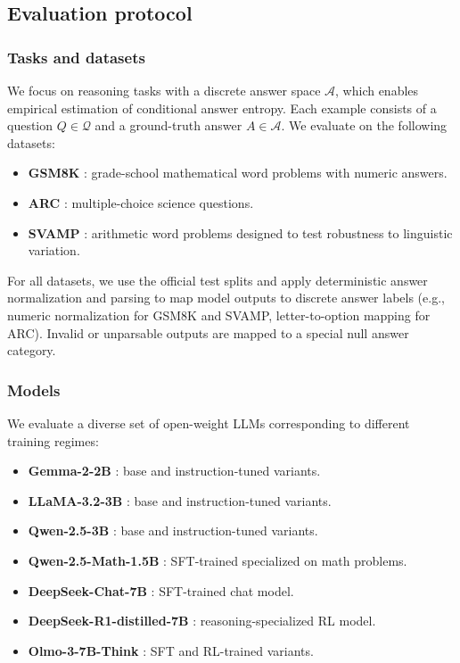 \documentclass{article}
\begin{document}
\subsection{Evaluation protocol}
\label{subsec:eval_protocol}

\subsubsection{Tasks and datasets}
\label{subsec:tasks_datasets}

We focus on reasoning tasks with a discrete answer space \(\mathcal{A}\), which enables empirical estimation of conditional answer entropy. Each example consists of a question \(Q \in \mathcal{Q}\) and a ground-truth answer \(A \in \mathcal{A}\). We evaluate on the following datasets:

\begin{itemize}
\item \textbf{GSM8K} \cite{cobbe2021trainingverifierssolvemath}: grade-school mathematical word problems with numeric answers.
\item \textbf{ARC} \cite{clark2018thinksolvedquestionanswering}: multiple-choice science questions.
\item \textbf{SVAMP} \cite{patel2021nlpmodelsreallyable}: arithmetic word problems designed to test robustness to linguistic variation.
\end{itemize}

For all datasets, we use the official test splits and apply deterministic answer normalization and parsing to map model outputs to discrete answer labels (e.g., numeric normalization for GSM8K and SVAMP, letter-to-option mapping for ARC). Invalid or unparsable outputs are mapped to a special null answer category.

\subsubsection{Models}
\label{subsec:models}

We evaluate a diverse set of open-weight LLMs corresponding to different training regimes:

\begin{itemize}
\item \textbf{Gemma-2-2B} \cite{gemmateam2024gemma2improvingopen}: base and instruction-tuned variants.
\item \textbf{LLaMA-3.2-3B} \cite{grattafiori2024llama3herdmodels}: base and instruction-tuned variants.
\item \textbf{Qwen-2.5-3B} \cite{qwen2025qwen25technicalreport}: base and instruction-tuned variants.
\item \textbf{Qwen-2.5-Math-1.5B} \cite{qwen2025qwen25technicalreport}: SFT-trained specialized on math problems.
\item \textbf{DeepSeek-Chat-7B} \cite{deepseekai2024deepseekllmscalingopensource}: SFT-trained chat model.
\item \textbf{DeepSeek-R1-distilled-7B} \cite{Guo_2025}: reasoning-specialized RL model.
\item \textbf{Olmo-3-7B-Think} \cite{olmo2025olmo3}: SFT and RL-trained variants. 
\end{itemize}
\end{document}
